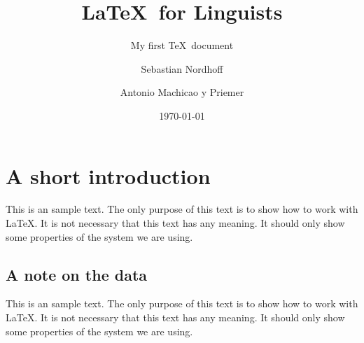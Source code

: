 \documentclass[10pt, paper=a4, abstracton]{scrartcl}
\author{Sebastian Nordhoff \and Antonio Machicao y Priemer}
\title{\LaTeX\ for Linguists}
\subtitle{My first \TeX\ document}
\date{\today}
\begin{document}
\maketitle

\tableofcontents


\section[Introduction]{A short introduction}

This is an sample text. The only purpose of this text is to show how to work with \LaTeX . It is not necessary that this text has any meaning. It should only show some properties of the system we are using.


\subsection{A note on the data}

This is an sample text. The only purpose of this text is to show how to work with \LaTeX . It is not necessary that this text has any meaning. It should only show some properties of the system we are using.
\end{document}
